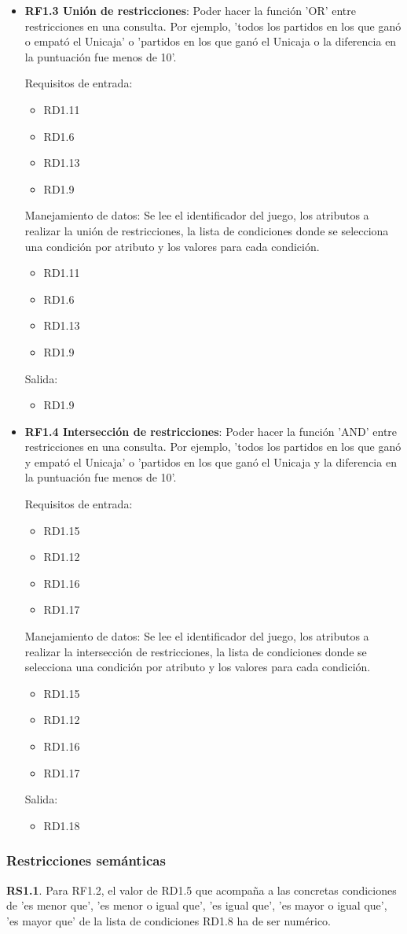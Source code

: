 \begin{itemize}
	
	\item \textbf{RF1.3 Unión de restricciones}: Poder hacer la función 'OR' entre restricciones en una consulta. Por ejemplo, 'todos los partidos en los que ganó o empató el Unicaja' o 'partidos en los que ganó el Unicaja o la diferencia en la puntuación fue menos de 10'.
	
	Requisitos de entrada:
	\begin{itemize}
		\item RD1.11
		\item RD1.6
		\item RD1.13
		\item RD1.9
	\end{itemize}
	Manejamiento de datos: Se lee el identificador del juego, los atributos a realizar la unión de restricciones, la lista de condiciones donde se selecciona una condición por atributo y los valores para cada condición.
	\begin{itemize}
		\item RD1.11
		\item RD1.6
		\item RD1.13
		\item RD1.9
	\end{itemize}
	Salida:
	\begin{itemize}
		\item RD1.9
	\end{itemize}
	
	
	\item \textbf{RF1.4 Intersección de restricciones}: Poder hacer la función 'AND' entre restricciones en una consulta. Por ejemplo, 'todos los partidos en los que ganó y empató el Unicaja' o 'partidos en los que ganó el Unicaja y la diferencia en la puntuación fue menos de 10'.
	
	Requisitos de entrada:
	\begin{itemize}
		\item RD1.15
		\item RD1.12
		\item RD1.16
		\item RD1.17
	\end{itemize}
	Manejamiento de datos: Se lee el identificador del juego, los atributos a realizar la intersección de restricciones, la lista de condiciones donde se selecciona una condición por atributo y los valores para cada condición.
	\begin{itemize}
		\item RD1.15
		\item RD1.12
		\item RD1.16
		\item RD1.17
	\end{itemize}
	Salida:
	\begin{itemize}
		\item RD1.18
	\end{itemize}
\end{itemize}




\subsubsection{Restricciones semánticas}

\textbf{RS1.1}. Para RF1.2, el valor de RD1.5 que acompaña a las concretas condiciones de 'es menor que', 'es menor o igual que', 'es igual que', 'es mayor o igual que', 'es mayor que' de la lista de condiciones RD1.8 ha de ser numérico.